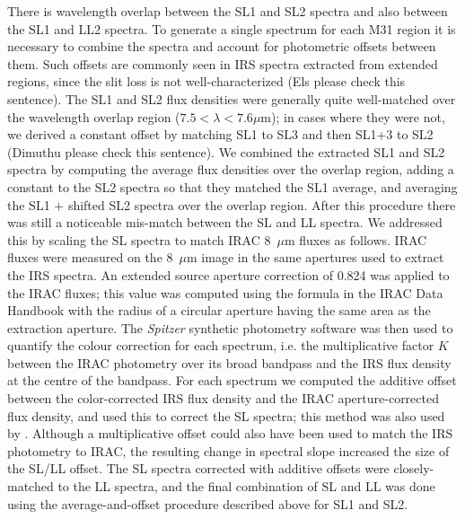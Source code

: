 %
%
%


There is wavelength overlap between the SL1 and SL2 spectra and also between the SL1 and LL2 spectra.
To generate a single spectrum for each M31 region it is necessary to combine the spectra and
account for photometric offsets between them. Such offsets are commonly seen in IRS spectra extracted
from extended regions, since the slit loss is not well-characterized (Els please check this sentence).
The SL1 and SL2 flux densities were
generally quite well-matched over the wavelength overlap region ($7.5 < \lambda< 7.6\mu$m); in cases
where they were not, we derived a constant offset by matching SL1 to SL3 and then SL1+3 to SL2
(Dimuthu please check this sentence). We  combined the extracted SL1 and SL2 
spectra by computing the average flux densities over the  overlap region,
adding a constant  to the SL2 spectra so that they matched the SL1 average,
and averaging the SL1 $+$ shifted SL2 spectra over the overlap region.
After this procedure there was still a noticeable mis-match between the SL and LL spectra. We addressed this
by scaling the SL spectra to match IRAC 8~$\mu$m fluxes as follows. IRAC fluxes were measured
on the 8~$\mu$m image \citep{Barmby2006lr} in the same apertures used to extract the IRS spectra.
An extended source  aperture correction of 0.824 was applied to the IRAC fluxes; this value was computed 
using the formula in the IRAC Data Handbook \citep{} with
the radius of a circular aperture having the same area as the extraction aperture.
The {\em Spitzer} synthetic photometry software \citep{SpitzerDAC} 
was then used to quantify the colour correction for each spectrum, i.e. the
multiplicative factor $K$ between the IRAC photometry over its broad bandpass and the IRS flux
density at the centre of the bandpass.  For each spectrum we computed the additive
offset between the color-corrected IRS flux density and the IRAC aperture-corrected flux density,
and used this to correct the SL spectra; this method was also used by \citet{Sandstrom12}.
Although a multiplicative offset could also have been used to match the IRS photometry to IRAC,
the resulting change in spectral slope increased the size of the SL/LL offset.
The SL spectra corrected with additive offsets were closely-matched to the LL spectra, and the final combination
of SL and LL was done using the average-and-offset procedure described above for SL1 and SL2.

